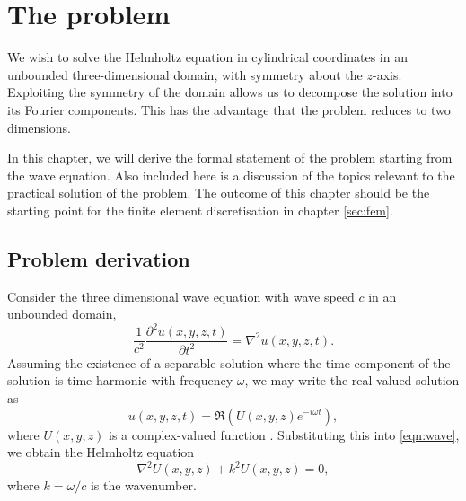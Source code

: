\chapter{The problem}
\label{sec:problem}

We wish to solve the Helmholtz equation in cylindrical coordinates in an unbounded three-dimensional domain, with symmetry about the $z$-axis.
Exploiting the symmetry of the domain allows us to decompose the solution into its Fourier components.
This has the advantage that the problem reduces to two dimensions.

In this chapter, we will derive the formal statement of the problem starting from the wave equation.
Also included here is a discussion of the topics relevant to the practical solution of the problem.
The outcome of this chapter should be the starting point for the finite element discretisation in chapter \ref{sec:fem}.





\section{Problem derivation}

Consider the three dimensional wave equation with wave speed $c$ in an unbounded domain,
\begin{equation}
	\frac{1}{c^2} \frac{\partial^2 u(x,y,z,t)}{\partial t^2} = \nabla^2 u(x,y,z,t). \label{eqn:wave}
\end{equation}
Assuming the existence of a separable solution where the time component of the solution is time-harmonic with frequency $\omega$,
we may write the real-valued solution as
\[
	u(x,y,z,t) = \Re \left( U(x,y,z)e^{-i\omega t} \right),
\]
where $U(x,y,z)$ is a complex-valued function \cite{oomph_hh}.
Substituting this into \eqref{eqn:wave}, we obtain the Helmholtz equation
\begin{equation}
	\nabla^2 U(x,y,z) + k^2 U(x,y,z) = 0, \label{eqn:hh}
\end{equation}
where $k=\omega/c$ is the wavenumber.

